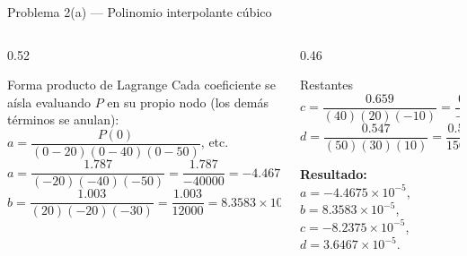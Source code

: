 \documentclass[aspectratio=169,10pt]{beamer}
\begin{document}
\begin{frame}{Problema 2(a) — Polinomio interpolante cúbico}
\begin{columns}[T]
\begin{column}{0.52\textwidth}
\begin{cardgear}{Forma producto de Lagrange}{\faSuperscript}
{\scriptsize Cada coeficiente se aísla evaluando $P$ en su propio nodo (los demás términos se anulan): $a=\dfrac{P(0)}{(0{-}20)(0{-}40)(0{-}50)}$, etc.
\[
a=\frac{1.787}{(-20)(-40)(-50)}=\frac{1.787}{-40000}=-4.4675\!\times\!10^{-5},
\]
\[
b=\frac{1.003}{(20)(-20)(-30)}=\frac{1.003}{12000}=8.3583\!\times\!10^{-5}.
\]}
\end{cardgear}
\end{column}
\begin{column}{0.46\textwidth}
\begin{cardgear}{Restantes}{\faCalculator}
{\scriptsize
\[
c=\frac{0.659}{(40)(20)(-10)}=\frac{0.659}{-8000}=-8.2375\!\times\!10^{-5},
\]
\[
d=\frac{0.547}{(50)(30)(10)}=\frac{0.547}{15000}=3.6467\!\times\!10^{-5}.
\]}
\end{cardgear}
\vspace{1mm}
\begin{cardnota}[\faCheckCircle]
{\scriptsize \textbf{Resultado:}\ $a=-4.4675\!\times\!10^{-5}$,\ $b=8.3583\!\times\!10^{-5}$,\ $c=-8.2375\!\times\!10^{-5}$,\ $d=3.6467\!\times\!10^{-5}$.}
\end{cardnota}
\end{column}
\end{columns}
\end{frame}
\end{document}

